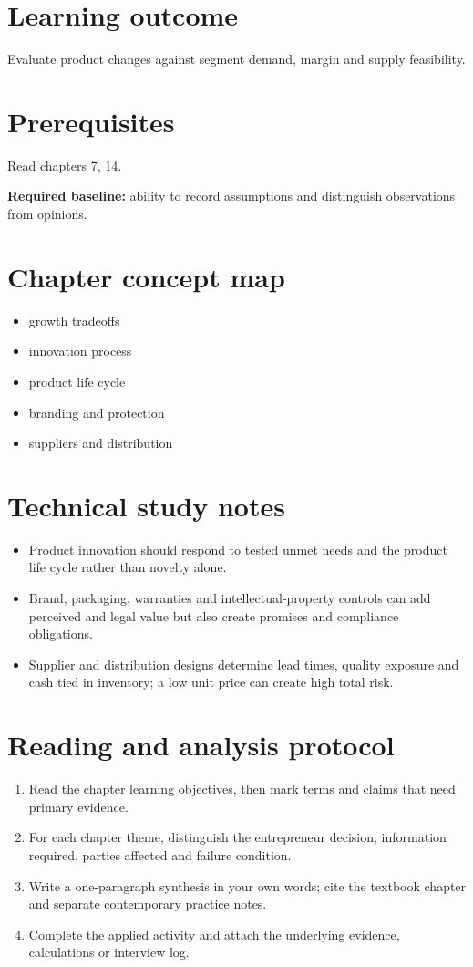 \documentclass[11pt,letterpaper]{article}
\begin{document}
\SuiteOpen
\section{Learning outcome}
Evaluate product changes against segment demand, margin and supply feasibility.
\section{Prerequisites}
Read chapters 7, 14.\par\textbf{Required baseline:} ability to record assumptions and distinguish observations from opinions.
\section{Chapter concept map}
\begin{itemize}[leftmargin=*,itemsep=3pt]
\item growth tradeoffs
\item innovation process
\item product life cycle
\item branding and protection
\item suppliers and distribution
\end{itemize}

\section{Technical study notes}
\begin{itemize}[leftmargin=*,itemsep=3pt]
\item Product innovation should respond to tested unmet needs and the product life cycle rather than novelty alone.
\item Brand, packaging, warranties and intellectual-property controls can add perceived and legal value but also create promises and compliance obligations.
\item Supplier and distribution designs determine lead times, quality exposure and cash tied in inventory; a low unit price can create high total risk.
\end{itemize}

\section{Reading and analysis protocol}
\begin{enumerate}[leftmargin=*,itemsep=5pt]
\item Read the chapter learning objectives, then mark terms and claims that need primary evidence.
\item For each chapter theme, distinguish the entrepreneur decision, information required, parties affected and failure condition.
\item Write a one-paragraph synthesis in your own words; cite the textbook chapter and separate contemporary practice notes.
\item Complete the applied activity and attach the underlying evidence, calculations or interview log.
\end{enumerate}
\end{document}
